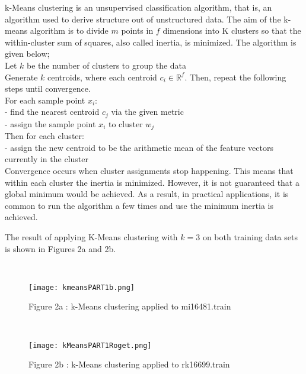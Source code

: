 \begin{flushleft}
k-Means clustering is an unsupervised classification algorithm, that is, an algorithm used to derive structure out of unstructured data. The aim of the k-means algorithm is to divide $m$ points in $f$ dimensions into K clusters so that the within-cluster sum of squares, also called inertia, is minimized.\cite{kmeans1} The algorithm is given below;
\\
Let $k$ be the number of clusters to group the data
\\
Generate $k$ centroids, where each centroid $c_{i} \in \mathbb{R}^f$. Then, repeat the following steps until convergence.
\\
For each sample point $x_{i}$:
\\
\tab- find the nearest centroid $c_{j}$ via the given metric
\\
\tab- assign the sample point $x_{i}$ to cluster $w_{j}$
\\
Then for each cluster:
\\
- assign the new centroid to be the arithmetic mean of the feature vectors currently in the cluster
\\
\vspace{5mm}
Convergence occurs when cluster assignments stop happening. This means that within each cluster the inertia is minimized. However, it is not guaranteed that a global minimum would be achieved. As a result, in practical applications, it is common to run the algorithm a few times and use the minimum inertia is achieved.

The result of applying K-Means clustering with $k=3$ on both training data sets is shown in Figures 2a and 2b.
\end{flushleft}
\\
\begin{wrapfigure}{}{\textwidth}
  \begin{center}
      \texttt{[image: kmeansPART1b.png]}
          \caption{Figure 2a : k-Means clustering applied to mi16481.train}
           \end{center}
           \end{wrapfigure}
           \\
           \begin{wrapfigure}{}{\textwidth}
             \begin{center}
                 \texttt{[image: kMeansPART1Roget.png]}
                     \caption{Figure 2b : k-Means clustering applied to rk16699.train}
                      \end{center}
                      \end{wrapfigure}
